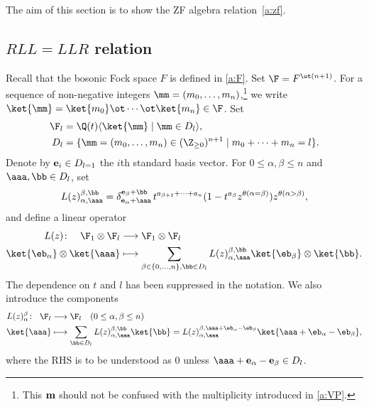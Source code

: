 The aim of this section is to show the ZF algebra relation~\eqref{a:zf}. 

\subsection{\texorpdfstring{$RLL=LLR$}{RLL=LLR} relation}
Recall that the bosonic Fock space $F$ is defined in \eqref{a:F}.
Set $\F=F^{\ot (n+1)}$. 
For a sequence of non-negative integers $\mm=(m_0,\ldots,m_n)$,\footnote{This ${\bf m}$ should not be confused with 
the multiplicity introduced in \eqref{a:VP}.}
we write $\ket{\mm}=\ket{m_0}\ot\cdots\ot\ket{m_n} \in \F$.
Set 
\begin{align}
\F_l & =\Q(t)\langle\ket{\mm}\mid  \mm \in D_l \rangle,
\\
D_l &= \{\mm = (m_0,\ldots, m_n) \in (\Z_{\ge 0})^{n+1}\mid m_0+\cdots +  m_n = l\}.
\label{a:dl}
\end{align}
Denote by ${\bf e}_i \in D_{l=1}$ the $i$th standard basis vector.
For $0\le\alpha,\beta\le n$
and $\aaa, \bb \in D_l$,  set
\begin{align}
L(z)^{\beta, \bb}_{\alpha, \aaa} = \delta_{ {\bf e}_\alpha +\aaa}^{ {\bf e}_\beta+ \bb}\,
t^{a_{\beta+1}+ \cdots + a_n}(1-t^{a_\beta}z^{\theta(\alpha=\beta)})z^{\theta(\alpha>\beta)},
\label{a:L1}
\end{align}
and define a linear operator 
\begin{equation}\label{a:L}
\begin{aligned}
L(z)\colon \quad  \F_1 \otimes \F_l & \longrightarrow \F_1 \otimes \F_l
\\
\ket{\eb_\alpha} \otimes \ket{\aaa} & \longmapsto
\sum_{\beta\in \{0,\ldots, n\}, \bb \in D_l}L(z)^{\beta, \bb}_{\alpha, \aaa}
\ket{\eb_\beta} \otimes \ket{\bb}.
\end{aligned}
\end{equation}
The dependence on $t$ and $l$ has been suppressed in the notation.
%
We also introduce the components
\begin{equation}\label{a:Lab}
\begin{aligned}
L(z)_\alpha^\beta \colon \;\; \F_l & \longrightarrow  \F_l\quad (0\le \alpha, \beta \le n)
\\
\ket{\aaa} & \longmapsto
\sum_{\bb \in D_l}L(z)^{\beta, \bb}_{\alpha, \aaa}\ket{\bb} = 
L(z)^{\beta, \aaa+\eb_\alpha-\eb_\beta}_{\alpha, \aaa}\ket{\aaa+\eb_\alpha-\eb_\beta},
\end{aligned}
\end{equation}
where the RHS is to be understood as 0 unless $\aaa+{\bf e}_\alpha-{\bf e}_{\beta} \in D_l$.


